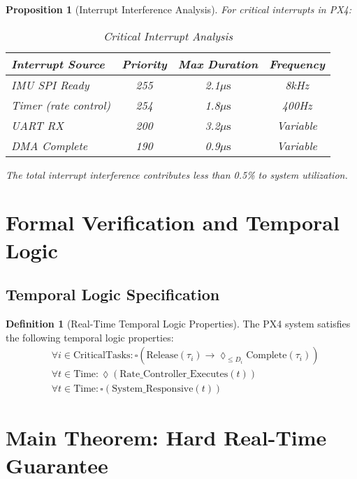 \documentclass[11pt,a4paper]{article}
\newcommand{\mus}{\ensuremath{\mu\text{s}}}
\newtheorem{proposition}[theorem]{Proposition}
\theoremstyle{definition}
\newtheorem{definition}[theorem]{Definition}
\theoremstyle{remark}
\begin{document}
\begin{proposition}[Interrupt Interference Analysis]
For critical interrupts in PX4:

\begin{table}[h]
\centering
\caption{Critical Interrupt Analysis}
\begin{tabular}{lccc}
\toprule
\textbf{Interrupt Source} & \textbf{Priority} & \textbf{Max Duration} & \textbf{Frequency} \\
\midrule
IMU SPI Ready & 255 & 2.1\mus & 8kHz \\
Timer (rate control) & 254 & 1.8\mus & 400Hz \\
UART RX & 200 & 3.2\mus & Variable \\
DMA Complete & 190 & 0.9\mus & Variable \\
\bottomrule
\end{tabular}
\end{table}

The total interrupt interference contributes less than 0.5\% to system utilization.
\end{proposition}

\section{Formal Verification and Temporal Logic}

\subsection{Temporal Logic Specification}

\begin{definition}[Real-Time Temporal Logic Properties]
The PX4 system satisfies the following temporal logic properties:
\begin{align}
&\forall i \in \text{CriticalTasks}: \square(\text{Release}(\tau_i) \rightarrow \lozenge_{\leq D_i} \text{Complete}(\tau_i)) \\
&\forall t \in \text{Time}: \lozenge(\text{Rate\_Controller\_Executes}(t)) \\
&\forall t \in \text{Time}: \square(\text{System\_Responsive}(t))
\end{align}
\end{definition}

\section{Main Theorem: Hard Real-Time Guarantee}
\end{document}
